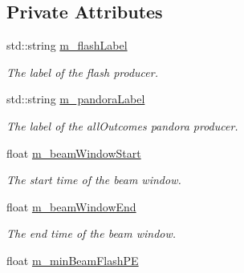 \subsection*{Private Attributes}
\begin{DoxyCompactItemize}
\item 
std\+::string \hyperlink{classflashmatch_1_1FlashMatchingTool_a1d8717c68408b4b6bcada1d833f52b85}{m\+\_\+flash\+Label}\hypertarget{classflashmatch_1_1FlashMatchingTool_a1d8717c68408b4b6bcada1d833f52b85}{}\label{classflashmatch_1_1FlashMatchingTool_a1d8717c68408b4b6bcada1d833f52b85}

\begin{DoxyCompactList}\small\item\em The label of the flash producer. \end{DoxyCompactList}\item 
std\+::string \hyperlink{classflashmatch_1_1FlashMatchingTool_a268e4c99f49178112c76b0fd4f5dc83e}{m\+\_\+pandora\+Label}\hypertarget{classflashmatch_1_1FlashMatchingTool_a268e4c99f49178112c76b0fd4f5dc83e}{}\label{classflashmatch_1_1FlashMatchingTool_a268e4c99f49178112c76b0fd4f5dc83e}

\begin{DoxyCompactList}\small\item\em The label of the all\+Outcomes pandora producer. \end{DoxyCompactList}\item 
float \hyperlink{classflashmatch_1_1FlashMatchingTool_a33272b2692b9eee1ee1f5af82696e558}{m\+\_\+beam\+Window\+Start}\hypertarget{classflashmatch_1_1FlashMatchingTool_a33272b2692b9eee1ee1f5af82696e558}{}\label{classflashmatch_1_1FlashMatchingTool_a33272b2692b9eee1ee1f5af82696e558}

\begin{DoxyCompactList}\small\item\em The start time of the beam window. \end{DoxyCompactList}\item 
float \hyperlink{classflashmatch_1_1FlashMatchingTool_a8a7cc0d75c962df7d5bf20cc1edccde2}{m\+\_\+beam\+Window\+End}\hypertarget{classflashmatch_1_1FlashMatchingTool_a8a7cc0d75c962df7d5bf20cc1edccde2}{}\label{classflashmatch_1_1FlashMatchingTool_a8a7cc0d75c962df7d5bf20cc1edccde2}

\begin{DoxyCompactList}\small\item\em The end time of the beam window. \end{DoxyCompactList}\item 
float \hyperlink{classflashmatch_1_1FlashMatchingTool_ab6bfd0f0b1d32f1d647d978963ffcfea}{m\+\_\+min\+Beam\+Flash\+PE}\hypertarget{classflashmatch_1_1FlashMatchingTool_ab6bfd0f0b1d32f1d647d978963ffcfea}{}\label{classflashmatch_1_1FlashMatchingTool_ab6bfd0f0b1d32f1d647d978963ffcfea}


\end{DoxyCompactItemize}
